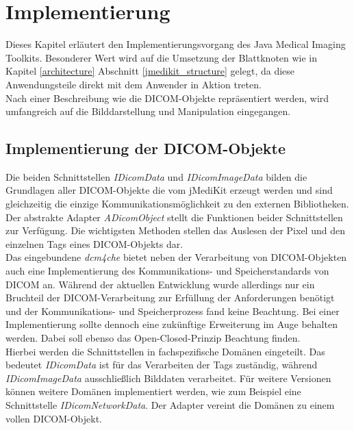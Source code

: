 \chapter{Implementierung} \label{implementation}

Dieses Kapitel erläutert den Implementierungsvorgang des Java Medical Imaging Toolkits. Besonderer Wert wird auf die Umsetzung der Blattknoten wie in Kapitel \ref{architecture} Abschnitt \ref{jmedikit_structure} gelegt, da diese Anwendungsteile direkt mit dem Anwender in Aktion treten.\\
Nach einer Beschreibung wie die DICOM-Objekte repräsentiert werden, wird umfangreich auf die Bilddarstellung und Manipulation eingegangen.

\section{Implementierung der DICOM-Objekte}

Die beiden Schnittstellen \textit{IDicomData} und \textit{IDicomImageData} bilden die Grundlagen aller DICOM-Objekte die vom jMediKit erzeugt werden und sind gleichzeitig die einzige Kommunikationsmöglichkeit zu den externen Bibliotheken. Der abstrakte Adapter \textit{ADicomObject} stellt die Funktionen beider Schnittstellen zur Verfügung. Die wichtigsten Methoden stellen das Auslesen der Pixel und den einzelnen Tags eines DICOM-Objekts dar. \\
Das eingebundene \textit{dcm4che} bietet neben der Verarbeitung von DICOM-Objekten auch eine Implementierung des Kommunikations- und Speicherstandards von DICOM an. Während der aktuellen Entwicklung wurde allerdings nur ein Bruchteil der DICOM-Verarbeitung zur Erfüllung der Anforderungen benötigt und der Kommunikations- und Speicherprozess fand keine Beachtung. Bei einer Implementierung sollte dennoch eine zukünftige Erweiterung im Auge behalten werden. Dabei soll ebenso das Open-Closed-Prinzip Beachtung finden.\\
Hierbei werden die Schnittstellen in fachspezifische Domänen eingeteilt. Das bedeutet \textit{IDicomData} ist für das Verarbeiten der Tags zuständig, während \textit{IDicomImageData} ausschließlich Bilddaten verarbeitet. Für weitere Versionen können weitere Domänen implementiert werden, wie zum Beispiel eine Schnittstelle \textit{IDicomNetworkData}. Der Adapter vereint die Domänen zu einem vollen DICOM-Objekt. 


